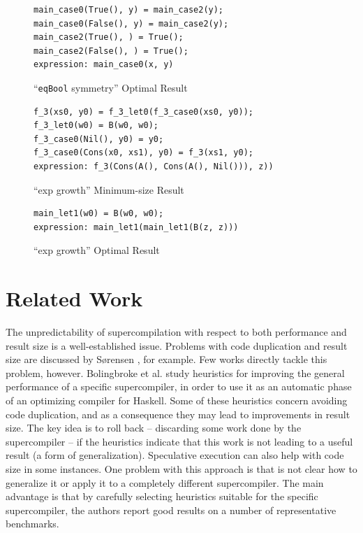 \documentclass[submission,copyright,creativecommons]{eptcs}
\begin{document}
\begin{figure}
\begin{lstlisting}
main_case0(True(), y) = main_case2(y);
main_case0(False(), y) = main_case2(y);
main_case2(True(), ) = True();
main_case2(False(), ) = True();
expression: main_case0(x, y)
\end{lstlisting}
\caption{``\texttt{eqBool} symmetry'' Optimal Result}
\label{fig:BoolEqSymResult}
\end{figure}

\begin{figure}
\begin{lstlisting}
f_3(xs0, y0) = f_3_let0(f_3_case0(xs0, y0));
f_3_let0(w0) = B(w0, w0);
f_3_case0(Nil(), y0) = y0;
f_3_case0(Cons(x0, xs1), y0) = f_3(xs1, y0);
expression: f_3(Cons(A(), Cons(A(), Nil())), z))
\end{lstlisting}
\caption{``exp growth'' Minimum-size Result}
\label{fig:ExpGrowthMinResult}
\end{figure}

\begin{figure}
\begin{lstlisting}
main_let1(w0) = B(w0, w0);
expression: main_let1(main_let1(B(z, z)))
\end{lstlisting}
\caption{``exp growth'' Optimal Result}
\label{fig:ExpGrowthOptResult}
\end{figure}

\section{Related Work}

The unpredictability of supercompilation with respect to both performance and
result size is a well-established issue.
Problems with code duplication and result size are discussed by S{\o}rensen \cite{Sorensen1994TurchinSupercompiler}, 
for example.
Few works directly tackle this problem, however.
Bolingbroke et al. \cite{bolingbroke2011improving} study heuristics for improving the general
performance of a specific supercompiler, in order to use it as an automatic phase of an optimizing 
compiler for Haskell.
Some of these heuristics concern avoiding code duplication, and as a consequence they may
lead to improvements in result size.
The key idea is to roll back -- discarding some work done by the supercompiler -- if the heuristics
indicate that this work is not leading to a useful result (a form of generalization).
Speculative execution can also help with code size in some instances.
One problem with this approach is that is not clear how to generalize it or
apply it to a completely different supercompiler.
The main advantage is that by carefully selecting heuristics suitable for the specific
supercompiler, the authors report good results on a number of representative benchmarks.
\end{document}
